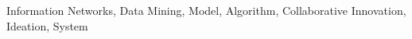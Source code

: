 \documentclass{sig-alternate}
\begin{document}


\keywords
{Information Networks, Data Mining, Model, Algorithm, Collaborative Innovation, Ideation, System}


















\end{document}
